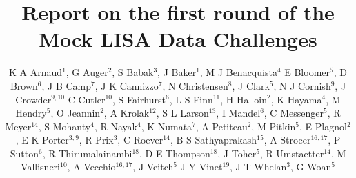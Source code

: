 \documentclass[12pt]{iopart}
\begin{document}
\title[MLDC first round report]{Report on the first round of the Mock LISA Data Challenges}

\author{K A Arnaud$^1$,
G Auger$^2$,
S Babak$^3$,
J Baker$^1$,
M J Benacquista$^4$
E Bloomer$^5$,
D Brown$^6$,
J B Camp$^7$,
J K Cannizzo$^7$,
N Christensen$^8$,
J Clark$^5$,
N J Cornish$^9$,
J Crowder$^{9,10}$
C Cutler$^{10}$,
S Fairhurst$^6$,
L S Finn$^{11}$,
H Halloin$^2$,
K Hayama$^4$,
M Hendry$^5$,
O Jeannin$^2$,
A Krolak$^{12}$,
S L Larson$^{13}$,
I Mandel$^6$,
C Messenger$^5$,
R Meyer$^{14}$,
S Mohanty$^4$,
R Nayak$^4$,
K Numata$^7$,
A Petiteau$^2$,
M Pitkin$^5$,
E Plagnol$^2$,
E K Porter$^{3,9}$,
R Prix$^3$,
C Roever$^{14}$,
B S Sathyaprakash$^{15}$,
A Stroeer$^{16,17}$,
P Sutton$^{6}$,
R Thirumalainambi$^{18}$,
D E Thompson$^{18}$,
J Toher$^5$,
R Umstaetter$^{14}$,
M Vallisneri$^{10}$,
A Vecchio$^{16,17}$,
J Veitch$^5$
J-Y Vinet$^{19}$,
J T Whelan$^3$,
G Woan$^5$}
\end{document}
